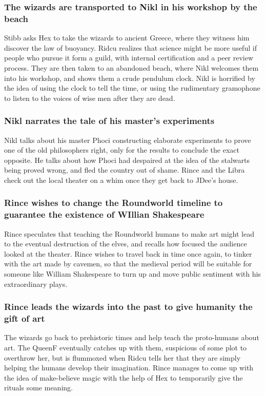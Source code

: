 \subsubsection{The wizards are transported to \Gls{Nikl} in his workshop by the beach}
\Gls{Stibb} asks \Gls{Hex} to take the wizards to ancient Greece, where they witness him discover
the law of buoyancy. \Gls{Ridcu} realizes that science might be more useful if people who pursue
it form a guild, with internal certification and a peer review process. They are then taken to an
abandoned beach, where \Gls{Nikl} welcomes them into his workshop, and shows them a crude pendulum
clock. \Gls{Nikl} is horrified by the idea of using the clock to tell the time, or using the
rudimentary gramophone to listen to the voices of wise men after they are dead.

\subsubsection{\Gls{Nikl} narrates the tale of his master's experiments}
\Gls{Nikl} talks about his master \Gls{Phoci} constructing elaborate experiments to prove one of
the old philosophers right, only for the results to conclude the exact opposite. He talks about how
\Gls{Phoci} had despaired at the idea of the stalwarts being proved wrong, and fled the country out
of shame. \Gls{Rince} and the \Gls{Libra} check out the local theater on a whim once they get back
to \Gls{JDee}'s house.

\subsubsection{\Gls{Rince} wishes to change the Roundworld timeline to guarantee the existence of
    WIllian Shakespeare}
\Gls{Rince} speculates that teaching the Roundworld humans to make art might lead to the eventual
destruction of the elves, and recalls how focused the audience looked at the theater. \Gls{Rince}
wishes to travel back in time once again, to tinker with the art made by cavemen, so that the
medieval period will be suitable for someone like William Shakespeare to turn up and move public
sentiment with his extraordinary plays.

\subsubsection{\Gls{Rince} leads the wizards into the past to give humanity the gift of art}
The wizards go back to prehistoric times and help teach the proto-humans about art. The \Gls{QueenF}
eventually catches up with them, suspicious of some plot to overthrow her, but is flummoxed when
\Gls{Ridcu} tells her that they are simply helping the humans develop their imagination.
\Gls{Rince} manages to come up with the idea of make-believe magic with the help of \Gls{Hex} to
temporarily give the rituals some meaning.

